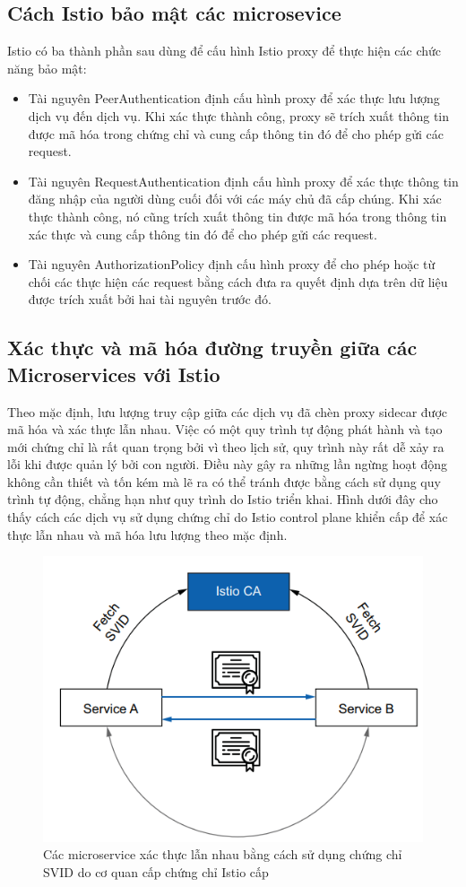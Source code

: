 \documentclass[14pt,a4paper]{book}
\begin{document}
{{		\subsection{Cách Istio bảo mật các microsevice}
			{\hspace{0.6cm}Istio có ba thành phần sau dùng để cấu hình Istio proxy để thực hiện các chức năng bảo mật:}
			\begin{itemize}
				\item Tài nguyên PeerAuthentication định cấu hình proxy để xác thực lưu lượng dịch vụ đến dịch vụ. Khi xác thực thành công, proxy sẽ trích xuất thông tin được mã hóa trong chứng chỉ và cung cấp thông tin đó để cho phép gửi các request.
				\item Tài nguyên RequestAuthentication định cấu hình proxy để xác thực thông tin đăng nhập của người dùng cuối đối với các máy chủ đã cấp chúng. Khi xác thực thành công, nó cũng trích xuất thông tin được mã hóa trong thông tin xác thực và cung cấp thông tin đó để cho phép gửi các request.
				\item Tài nguyên AuthorizationPolicy định cấu hình proxy để cho phép hoặc từ chối các thực hiện các request bằng cách đưa ra quyết định dựa trên dữ liệu được trích xuất bởi hai tài nguyên trước đó.
			\end{itemize}
		
		\subsection{Xác thực và mã hóa đường truyền giữa các Microservices với Istio}
			{\hspace{0.6cm}Theo mặc định, lưu lượng truy cập giữa các dịch vụ đã chèn proxy sidecar được mã hóa và xác thực lẫn nhau. Việc có một quy trình tự động phát hành và tạo mới chứng chỉ là rất quan trọng bởi vì theo lịch sử, quy trình này rất dễ xảy ra lỗi khi được quản lý bởi con người. Điều này gây ra những lần ngừng hoạt động không cần thiết và tốn kém mà lẽ ra có thể tránh được bằng cách sử dụng quy trình tự động, chẳng hạn như quy trình do Istio triển khai. Hình dưới đây cho thấy cách các dịch vụ sử dụng chứng chỉ do Istio control plane khiển cấp để xác thực lẫn nhau và mã hóa lưu lượng theo mặc định.}
			
			\begin{figure}[h]
				\centering
				\includegraphics[width=0.7\linewidth]{Pics/2.4.3-p1}
				\caption{Các microservice xác thực lẫn nhau bằng cách sử dụng chứng chỉ SVID do cơ quan cấp chứng chỉ Istio cấp }
				\label{fig:2}
			\end{figure}
			
}}
\end{document}
